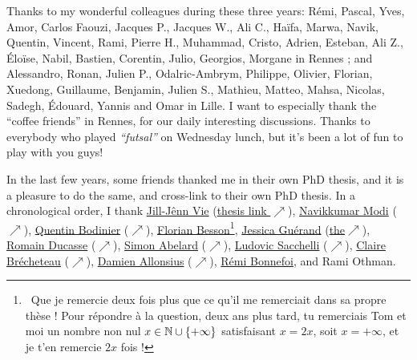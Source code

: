 \begin{acknowledgements}
Thanks to my wonderful colleagues during these three years: Rémi\textsuperscript{\tiny{\Coffeecup}}, Pascal\textsuperscript{\tiny{\Coffeecup}}, Yves, Amor, Carlos Faouzi, Jacques P., Jacques W., Ali C., Haïfa, Marwa, Navik, Quentin\textsuperscript{\tiny{\Coffeecup}}, Vincent\textsuperscript{\tiny{\Coffeecup}}, Rami\textsuperscript{\tiny{\Coffeecup}}, Pierre H., Muhammad, Cristo\textsuperscript{\tiny{\Coffeecup}}, Adrien\textsuperscript{\tiny{\Coffeecup}}, Esteban\textsuperscript{\tiny{\Coffeecup}}, Ali Z., Éloïse\textsuperscript{\tiny{\Coffeecup}}, Nabil\textsuperscript{\tiny{\Coffeecup}}, Bastien\textsuperscript{\tiny{\Coffeecup}}, Corentin\textsuperscript{\tiny{\Coffeecup}}, Julio, Georgios, Morgane\textsuperscript{\tiny{\Coffeecup}} in Rennes ; and Alessandro, Ronan, Julien P., Odalric-Ambrym, Philippe, Olivier, Florian, Xuedong, Guillaume, Benjamin, Julien S., Mathieu, Matteo, Mahsa, Nicolas, Sadegh, Édouard, Yannis and Omar in Lille.
I want to especially thank the ``coffee friends\textsuperscript{\tiny{\Coffeecup}}'' in Rennes, for our daily interesting discussions.
%
Thanks to everybody who played \emph{``futsal''} on Wednesday lunch,
but it's been a lot of fun to play with you guys!


In the last few years, some friends thanked me in their own PhD thesis, and it is a pleasure to do the same, and cross-link to their own PhD thesis.
In a chronological order, I thank
\href{http://jill-jenn.net/}{Jill-Jênn Vie} (\href{https://github.com/jilljenn/phd}{thesis link $\nearrow$}), \href{https://navikkumarmodi.wordpress.com/}{Navikkumar Modi} (\href{https://tel.archives-ouvertes.fr/tel-01668536/document}{$\nearrow$}), \href{https://quentinbodinier.wordpress.com/}{Quentin Bodinier} (\href{https://tel.archives-ouvertes.fr/tel-01731022/document}{$\nearrow$}), \href{https://paris-sorbonne.academia.edu/FBesson}{Florian Besson}\footnote{~Que je remercie deux fois plus que ce qu'il me remerciait dans sa propre thèse ! Pour répondre à la question, deux ans plus tard, tu remerciais Tom et moi un nombre non nul $x\in\mathbb{N}\cup\{+\infty\}$ satisfaisant $x=2x$, soit $x=+\infty$, et je t'en remercie $2x$ fois !}, \href{https://sites.google.com/view/guerand}{Jessica Guérand} (\href{https://www.theses.fr/s175725}{the}\href{https://www.theses.fr/s175725}{$\nearrow$}), \href{https://sites.google.com/view/ducasse/}{Romain Ducasse} (\href{https://drive.google.com/open?id=1u2oxRRimcO0jQfuYwSVwgKfcHU5DdoPK}{$\nearrow$}), \href{https://members.loria.fr/SAbelard/}{Simon Abelard} (\href{https://members.loria.fr/SAbelard/theseabelard.pdf}{$\nearrow$}), \href{http://www.cmap.polytechnique.fr/~sacchelli/}{Ludovic Sacchelli} (\href{https://tel.archives-ouvertes.fr/tel-01893068/document}{$\nearrow$}), \href{http://pages.saclay.inria.fr/claire.brecheteau/}{Claire Brécheteau} (\href{https://hal.archives-ouvertes.fr/tel-01897787/document}{$\nearrow$}), \href{http://www.i2m.univ-amu.fr/perso/damien.allonsius/}{Damien Allonsius} (\href{http://www.i2m.univ-amu.fr/perso/damien.allonsius/documents/recherche/these/Main.pdf}{$\nearrow$}), \href{https://remibonnefoi.wordpress.com/}{Rémi Bonnefoi}, and Rami Othman.



\end{acknowledgements}
